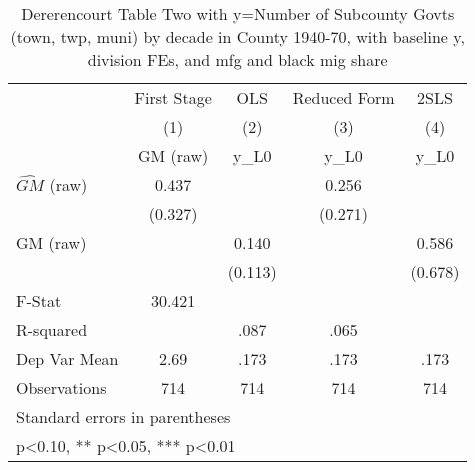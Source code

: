 \begin{table}[htbp]\centering
\def\sym#1{\ifmmode^{#1}\else\(^{#1}\)\fi}
\caption{Dererencourt Table Two with y=Number of Subcounty Govts (town, twp, muni) by decade in County 1940-70, with baseline y, division FEs, and mfg and black mig share}
\begin{tabular}{l*{4}{c}}
\toprule
                    & First Stage   &         OLS   &Reduced Form   &        2SLS   \\
                    &\multicolumn{1}{c}{(1)}&\multicolumn{1}{c}{(2)}&\multicolumn{1}{c}{(3)}&\multicolumn{1}{c}{(4)}\\
                    &\multicolumn{1}{c}{GM  (raw)}&\multicolumn{1}{c}{y\_L0}&\multicolumn{1}{c}{y\_L0}&\multicolumn{1}{c}{y\_L0}\\
\midrule
$\hat{GM}$ (raw)    &       0.437   &               &       0.256   &               \\
                    &     (0.327)   &               &     (0.271)   &               \\
\addlinespace
GM  (raw)           &               &       0.140   &               &       0.586   \\
                    &               &     (0.113)   &               &     (0.678)   \\
\midrule
F-Stat              &      30.421   &               &               &               \\
R-squared           &               &        .087   &        .065   &               \\
Dep Var Mean        &        2.69   &        .173   &        .173   &        .173   \\
Observations        &         714   &         714   &         714   &         714   \\
\bottomrule
\multicolumn{5}{l}{\footnotesize Standard errors in parentheses}\\
\multicolumn{5}{l}{\footnotesize * p<0.10, ** p<0.05, *** p<0.01}\\
\end{tabular}
\end{table}
